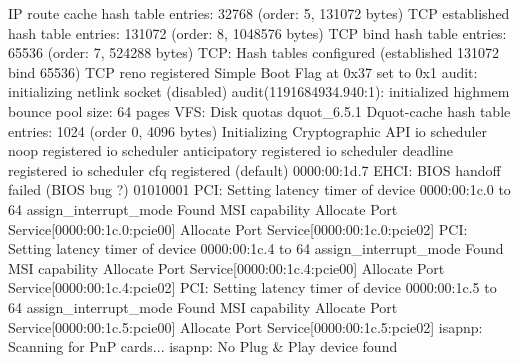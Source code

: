 \documentclass[mingoth,a4paper]{jsarticle}
\begin{document}
\begin{commandline}
IP route cache hash table entries: 32768 (order: 5, 131072 bytes)
TCP established hash table entries: 131072 (order: 8, 1048576 bytes)
TCP bind hash table entries: 65536 (order: 7, 524288 bytes)
TCP: Hash tables configured (established 131072 bind 65536)
TCP reno registered
Simple Boot Flag at 0x37 set to 0x1
audit: initializing netlink socket (disabled)
audit(1191684934.940:1): initialized
highmem bounce pool size: 64 pages
VFS: Disk quotas dquot_6.5.1
Dquot-cache hash table entries: 1024 (order 0, 4096 bytes)
Initializing Cryptographic API
io scheduler noop registered
io scheduler anticipatory registered
io scheduler deadline registered
io scheduler cfq registered (default)
0000:00:1d.7 EHCI: BIOS handoff failed (BIOS bug ?) 01010001
PCI: Setting latency timer of device 0000:00:1c.0 to 64
assign_interrupt_mode Found MSI capability
Allocate Port Service[0000:00:1c.0:pcie00]
Allocate Port Service[0000:00:1c.0:pcie02]
PCI: Setting latency timer of device 0000:00:1c.4 to 64
assign_interrupt_mode Found MSI capability
Allocate Port Service[0000:00:1c.4:pcie00]
Allocate Port Service[0000:00:1c.4:pcie02]
PCI: Setting latency timer of device 0000:00:1c.5 to 64
assign_interrupt_mode Found MSI capability
Allocate Port Service[0000:00:1c.5:pcie00]
Allocate Port Service[0000:00:1c.5:pcie02]
isapnp: Scanning for PnP cards...
isapnp: No Plug & Play device found
\end{commandline}
\end{document}
